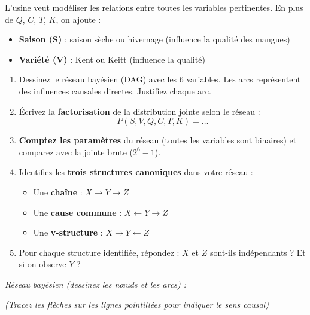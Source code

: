 \documentclass[11pt,a4paper]{article}
\begin{document}
\begin{exercicebox}[Énoncé]
L'usine veut modéliser les relations entre toutes les variables pertinentes. En plus de $Q$, $C$, $T$, $K$, on ajoute :
\begin{itemize}[nosep]
    \item \textbf{Saison (S)} : saison sèche ou hivernage (influence la qualité des mangues)
    \item \textbf{Variété (V)} : Kent ou Keitt (influence la qualité)
\end{itemize}

\begin{enumerate}
    \item Dessinez le réseau bayésien (DAG) avec les 6 variables. Les arcs représentent des influences causales directes. Justifiez chaque arc.
    \item Écrivez la \textbf{factorisation} de la distribution jointe selon le réseau :
    $$P(S, V, Q, C, T, K) = \ldots$$
    \item \textbf{Comptez les paramètres} du réseau (toutes les variables sont binaires) et comparez avec la jointe brute ($2^6 - 1$).
    \item Identifiez les \textbf{trois structures canoniques} dans votre réseau :
    \begin{itemize}
        \item Une \textbf{chaîne} : $X \to Y \to Z$
        \item Une \textbf{cause commune} : $X \leftarrow Y \to Z$
        \item Une \textbf{v-structure} : $X \to Y \leftarrow Z$
    \end{itemize}
    \item Pour chaque structure identifiée, répondez : $X$ et $Z$ sont-ils indépendants ? Et si on observe $Y$ ?
\end{enumerate}
\end{exercicebox}

\noindent\textit{Réseau bayésien (dessinez les nœuds et les arcs) :}

\begin{center}

\textit{(Tracez les flèches sur les lignes pointillées pour indiquer le sens causal)}
\end{center}
\end{document}
